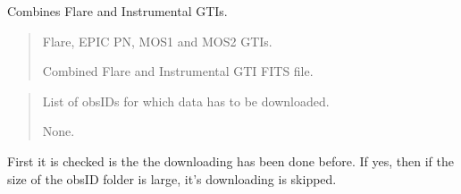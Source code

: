 \documentclass[letterpaper,10pt,english]{sphinxmanual}
\begin{document}
\begin{fulllineitems}
\begin{fulllineitems}
\begin{quote}
\begin{description}
\end{description}\end{quote}

\end{fulllineitems}


\begin{fulllineitems}
\label{\detokenize{xmmPipeline:xmmPipeline.epicObj.epicObj.combineGTIs}}
\pysigstartsignatures
{}
\pysigstopsignatures
\sphinxAtStartPar
Combines Flare and Instrumental GTIs.
\begin{quote}\begin{description}
\sphinxAtStartPar
Flare, EPIC PN, MOS1 and MOS2 GTIs.

\sphinxAtStartPar
Combined Flare and Instrumental GTI FITS file.

\end{description}\end{quote}

\end{fulllineitems}


\begin{fulllineitems}
\label{\detokenize{xmmPipeline:xmmPipeline.epicObj.epicObj.downloadData}}
\pysigstartsignatures
{}
\pysigstopsignatures\begin{quote}\begin{description}
\sphinxAtStartPar
List of obsIDs for which data has to be downloaded.

\sphinxAtStartPar
None.

\end{description}\end{quote}

\sphinxAtStartPar
First it is checked is the the downloading has been done before.
If yes, then if the size of the obsID folder is large, it’s downloading is skipped.

\end{fulllineitems}



\end{fulllineitems}
\end{document}
